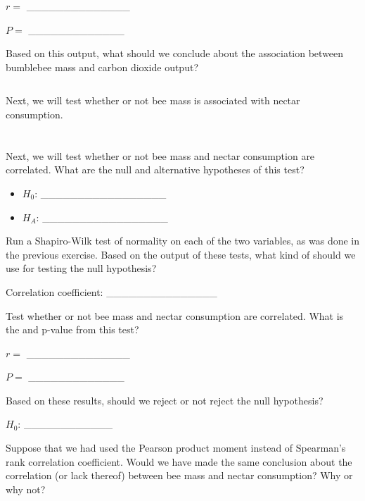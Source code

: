 \documentclass[
  openany]{krantz}
\begin{document}
\(r =\) \_\_\_\_\_\_\_\_\_\_\_\_\_\_

\(P =\) \_\_\_\_\_\_\_\_\_\_\_\_\_

Based on this output, what should we conclude about the association between bumblebee mass and carbon dioxide output?

\begin{verbatim}

\end{verbatim}

Next, we will test whether or not bee mass is associated with nectar consumption.

\hypertarget{section-2}{%
\section{\texorpdfstring{}{}}\label{section-2}}

Next, we will test whether or not bee mass and nectar consumption are correlated.
What are the null and alternative hypotheses of this test?

\begin{itemize}
\item
  \(H_{0}\): \_\_\_\_\_\_\_\_\_\_\_\_\_\_\_\_\_
\item
  \(H_{A}\): \_\_\_\_\_\_\_\_\_\_\_\_\_\_\_\_\_
\end{itemize}

Run a Shapiro-Wilk test of normality on each of the two variables, as was done in the previous exercise.
Based on the output of these tests, what kind of  should we use for testing the null hypothesis?

Correlation coefficient: \_\_\_\_\_\_\_\_\_\_\_\_\_\_\_

Test whether or not bee mass and nectar consumption are correlated.
What is the  and p-value from this test?

\(r =\) \_\_\_\_\_\_\_\_\_\_\_\_\_\_

\(P =\) \_\_\_\_\_\_\_\_\_\_\_\_\_

Based on these results, should we reject or not reject the null hypothesis?

\(H_{0}\): \_\_\_\_\_\_\_\_\_\_\_\_

Suppose that we had used the Pearson product moment  instead of Spearman's rank correlation coefficient.
Would we have made the same conclusion about the correlation (or lack thereof) between bee mass and nectar consumption?
Why or why not?
\end{document}
